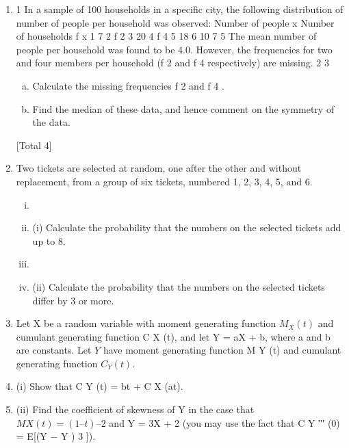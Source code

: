 \documentclass[a4paper,12pt]{article}
\begin{document}
\begin{enumerate}
\item 1
In a sample of 100 households in a specific city, the following distribution of number of people per household was observed:
Number of people x
Number of households f x
1
7
2
f 2
3
20
4
f 4
5
18
6
10
7
5
The mean number of people per household was found to be 4.0. However, the
frequencies for two and four members per household (f 2 and f 4 respectively) are
missing.
2
3

\begin{enumerate}[(a)]
\item Calculate the missing frequencies f 2 and f 4 .
\item Find the median of these data, and hence comment on the symmetry of the
data.
\end{enumerate}
[Total 4]
\item Two tickets are selected at random, one after the other and without replacement, from a group of six tickets, numbered 1, 2, 3, 4, 5, and 6.
\begin{enumerate}[(i)]
\item \item (i) Calculate the probability that the numbers on the selected tickets add up to 8.
\item 
\item (ii) Calculate the probability that the numbers on the selected tickets differ by
3 or more.
\end{enumerate}
\item Let X be a random variable with moment generating function $M_X (t)$ and cumulant generating function C X (t), and let Y = aX + b, where a and b are constants. Let $Y$ have moment generating function M Y (t) and cumulant generating function $C_Y (t)$.
\item (i) Show that C Y (t) = bt + C X (at).
\item (ii) Find the coefficient of skewness of Y in the case that $M X (t) = (1 – t) –2$ and
Y = 3X + 2 (you may use the fact that C Y ′′′ (0) = E[(Y − \mu  Y ) 3 ]).





\end{enumerate}
\end{document}
